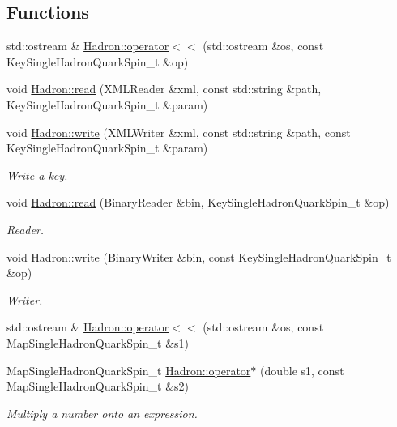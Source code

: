 \subsection*{Functions}
\begin{DoxyCompactItemize}
\item 
std\+::ostream \& \mbox{\hyperlink{namespaceHadron_a0dfff614f40f815cfb78d828c07bc8aa}{Hadron\+::operator$<$$<$}} (std\+::ostream \&os, const Key\+Single\+Hadron\+Quark\+Spin\+\_\+t \&op)
\item 
void \mbox{\hyperlink{namespaceHadron_a35b28e298745916c37daa929a874e099}{Hadron\+::read}} (X\+M\+L\+Reader \&xml, const std\+::string \&path, Key\+Single\+Hadron\+Quark\+Spin\+\_\+t \&param)
\item 
void \mbox{\hyperlink{namespaceHadron_a536d0c7d1bd20e64ba84b0588b3696f9}{Hadron\+::write}} (X\+M\+L\+Writer \&xml, const std\+::string \&path, const Key\+Single\+Hadron\+Quark\+Spin\+\_\+t \&param)
\begin{DoxyCompactList}\small\item\em Write a key. \end{DoxyCompactList}\item 
void \mbox{\hyperlink{namespaceHadron_a02133bc62e51d4baa57fb5ba0742ff43}{Hadron\+::read}} (Binary\+Reader \&bin, Key\+Single\+Hadron\+Quark\+Spin\+\_\+t \&op)
\begin{DoxyCompactList}\small\item\em Reader. \end{DoxyCompactList}\item 
void \mbox{\hyperlink{namespaceHadron_a780fbaaa0f7e3ba3453b4994b3ecd7d0}{Hadron\+::write}} (Binary\+Writer \&bin, const Key\+Single\+Hadron\+Quark\+Spin\+\_\+t \&op)
\begin{DoxyCompactList}\small\item\em Writer. \end{DoxyCompactList}\item 
std\+::ostream \& \mbox{\hyperlink{namespaceHadron_af9e168289a71f406cf53d10783cc513c}{Hadron\+::operator$<$$<$}} (std\+::ostream \&os, const Map\+Single\+Hadron\+Quark\+Spin\+\_\+t \&s1)
\item 
Map\+Single\+Hadron\+Quark\+Spin\+\_\+t \mbox{\hyperlink{namespaceHadron_a1ff2284ca0eec3b56aa1c075484c995f}{Hadron\+::operator$\ast$}} (double s1, const Map\+Single\+Hadron\+Quark\+Spin\+\_\+t \&s2)
\begin{DoxyCompactList}\small\item\em Multiply a number onto an expression. \end{DoxyCompactList}\item 

\end{DoxyCompactItemize}
